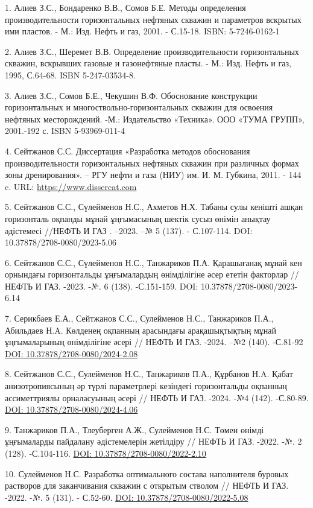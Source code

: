 	\begin{references}

1. Алиев З.С., Бондаренко В.В., Сомов Б.Е. Методы определения
производительности горизонтальных нефтяных скважин и параметров вскрытых
ими пластов. - М.: Изд. Нефть и газ, 2001. - С.15-18. ISBN:
5-7246-0162-1

2. Алиев З.С., Шеремет В.В. Определение производительности
горизонтальных скважин, вскрывших газовые и газонефтяные пласты. - М.:
Изд. Нефть и газ, 1995, С.64-68. ISBN 5-247-03534-8.

3. Алиев З.С., Сомов Б.Е., Чекушин В.Ф. Обоснование конструкции
горизонтальных и многоствольно-горизонтальных скважин для освоения
нефтяных месторождений. -М.: Издательство «Техника». ООО «ТУМА ГРУПП»,
2001.-192 с. ISBN 5-93969-011-4

4. Сейтжанов С.С. Диссертация «Разработка методов обоснования
производительности горизонтальных нефтяных скважин при различных формах
зоны дренирования». -- РГУ нефти и газа (НИУ) им. И. М. Губкина, 2011. -
144 c. URL: \url{https://www.dissercat.com}

5. Сейтжанов С.С., Сүлейменов Н.С., Ахметов Н.Х. Табаны сулы кенішті
ашқан горизонталь оқпанды мұнай ұңғымасының шектік сусыз өнімін анықтау
әдістемесі //НЕФТЬ И ГАЗ . --2023. --№ 5 (137). - С.107-114. DOI:
10.37878/2708-0080/2023-5.06

6. Сейтжанов С.С., Сүлейменов Н.С., Танжариков П.А. Қарашығанақ мұнай
кен орнындағы горизонтальды ұңғымалардың өнімділігіне әсер ететін
факторлар //НЕФТЬ И ГАЗ. -2023. -№. 6 (138). -С.151-159. DOI:
10.37878/2708-0080/2023-6.14

7. Серикбаев Е.А., Сейтжанов С.С., Сулейменов Н.С., Танжариков П.А.,
Абильдаев Н.A. Көлденең оқпанның арасындағы арақашықтықтың мұнай
ұңғымаларының өнімділігіне әсері // НЕФТЬ И ГАЗ. -2024. --№2 (140).
-С.81-92 \href{https://doi.org/10.37878/2708-0080/2024-2.08}{DOI:
10.37878/2708-0080/2024-2.08}

8. Сейтжанов С.С., Сулейменов Н.С., Танжариков П.А., Құрбанов Н.A. Қабат
анизотропиясының әр түрлі параметрлері кезіндегі горизонтальды оқпанның
ассиметтриялы орналасуының әсері // НЕФТЬ И ГАЗ. -2024. -№4 (142).
-С.80-89. \href{https://doi.org/10.37878/2708-0080/2024-4.06}{DOI:
10.37878/2708-0080/2024-4.06}

9. Танжариков П.А., Тлеуберген А.Ж., Сулейменов Н.С. Төмен өнімді
ұңғымаларды пайдалану әдістемелерін жетілдіру // НЕФТЬ И ГАЗ. -2022. -№.
2 (128). -С.104-116.
\href{https://doi.org/10.37878/2708-0080/2022-2.10}{DOI:
10.37878/2708-0080/2022-2.10}

10. Сулейменов Н.С. Разработка оптимального состава наполнителя буровых
растворов для заканчивания скважин с открытым стволом // НЕФТЬ И ГАЗ.
-2022. -№. 5 (131). - С.52-60.
\href{https://doi.org/10.37878/2708-0080/2022-5.08}{DOI:
10.37878/2708-0080/2022-5.08}

\end{references}

